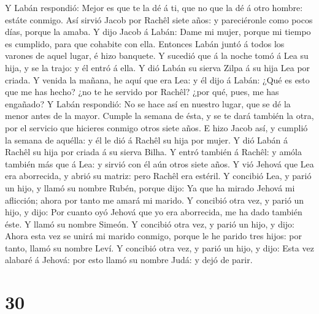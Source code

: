 Y Labán respondió: Mejor es que te la dé á ti, que no que la dé á otro
hombre: estáte conmigo.  Así sirvió Jacob por Rachêl
siete años: y pareciéronle como pocos días, porque la amaba.
 Y dijo Jacob á Labán: Dame mi mujer, porque mi tiempo es
cumplido, para que cohabite con ella.  Entonces Labán
juntó á todos los varones de aquel lugar, é hizo banquete.
 Y sucedió que á la noche tomó á Lea su hija, y se la
trajo: y él entró á ella.  Y dió Labán su sierva Zilpa á
su hija Lea por criada.  Y venida la mañana, he aquí que
era Lea: y él dijo á Labán: ¿Qué es esto que me has hecho? ¿no te he
servido por Rachêl? ¿por qué, pues, me has engañado?  Y
Labán respondió: No se hace así en nuestro lugar, que se dé la menor
antes de la mayor.  Cumple la semana de ésta, y se te
dará también la otra, por el servicio que hicieres conmigo otros siete
años.  E hizo Jacob así, y cumplió la semana de aquélla:
y él le dió á Rachêl su hija por mujer.  Y dió Labán á
Rachêl su hija por criada á su sierva Bilha.  Y entró
también á Rachêl: y amóla también más que á Lea: y sirvió con él aún
otros siete años.  Y vió Jehová que Lea era aborrecida, y
abrió su matriz: pero Rachêl era estéril.  Y concibió
Lea, y parió un hijo, y llamó su nombre Rubén, porque dijo: Ya que ha
mirado Jehová mi aflicción; ahora por tanto me amará mi marido.
 Y concibió otra vez, y parió un hijo, y dijo: Por cuanto
oyó Jehová que yo era aborrecida, me ha dado también éste. Y llamó su
nombre Simeón.  Y concibió otra vez, y parió un hijo, y
dijo: Ahora esta vez se unirá mi marido conmigo, porque le he parido
tres hijos: por tanto, llamó su nombre Leví.  Y concibió
otra vez, y parió un hijo, y dijo: Esta vez alabaré á Jehová: por esto
llamó su nombre Judá: y dejó de parir.

\hypertarget{section-29}{%
\section{30}\label{section-29}}

